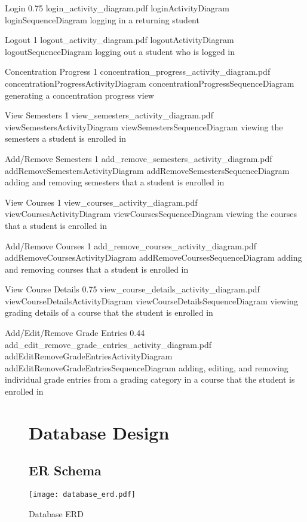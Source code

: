 \documentclass[12pt]{article}
\begin{document}
\actdia
  {Login}
  {0.75}
  {login_activity_diagram.pdf}
  {loginActivityDiagram}
  {loginSequenceDiagram}
  {logging in a returning student}

\actdia
  {Logout}
  {1}
  {logout_activity_diagram.pdf}
  {logoutActivityDiagram}
  {logoutSequenceDiagram}
  {logging out a student who is logged in}

\actdia
  {Concentration Progress}
  {1}
  {concentration_progress_activity_diagram.pdf}
  {concentrationProgressActivityDiagram}
  {concentrationProgressSequenceDiagram}
  {generating a concentration progress view}

\actdia
  {View Semesters}
  {1}
  {view_semesters_activity_diagram.pdf}
  {viewSemestersActivityDiagram}
  {viewSemestersSequenceDiagram}
  {viewing the semesters a student is enrolled in}

\actdia
  {Add/Remove Semesters}
  {1}
  {add_remove_semesters_activity_diagram.pdf}
  {addRemoveSemestersActivityDiagram}
  {addRemoveSemestersSequenceDiagram}
  {adding and removing semesters that a student is enrolled in}

\actdia
  {View Courses}
  {1}
  {view_courses_activity_diagram.pdf}
  {viewCoursesActivityDiagram}
  {viewCoursesSequenceDiagram}
  {viewing the courses that a student is enrolled in}

\actdia
  {Add/Remove Courses}
  {1}
  {add_remove_courses_activity_diagram.pdf}
  {addRemoveCoursesActivityDiagram}
  {addRemoveCoursesSequenceDiagram}
  {adding and removing courses that a student is enrolled in}

\actdia
  {View Course Details}
  {0.75}
  {view_course_details_activity_diagram.pdf}
  {viewCourseDetailsActivityDiagram}
  {viewCourseDetailsSequenceDiagram}
  {viewing grading details of a course that the student is enrolled in}

\actdia
  {Add/Edit/Remove Grade Entries}
  {0.44}
  {add_edit_remove_grade_entries_activity_diagram.pdf}
  {addEditRemoveGradeEntriesActivityDiagram}
  {addEditRemoveGradeEntriesSequenceDiagram}
  {adding, editing, and removing individual grade entries from a grading category in a course
  that the student is enrolled in}

\begin{figure}[p!]
  \section{Database Design}
  \subsection{ER Schema}
  \centering
  \texttt{[image: database\_erd.pdf]}
  \caption{Database ERD}
\end{figure}
\end{document}
